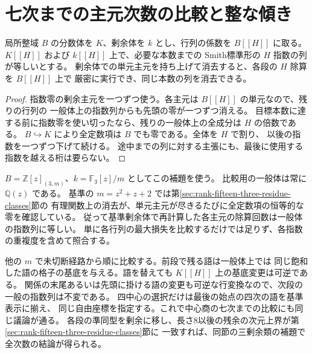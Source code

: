 \section{七次までの主元次数の比較と整な傾き}
\label{sec:rank-fifteen-smith-slopes}
\begin{lemma}\label{lem:rank-fifteen-smith-transfer}
局所整域 $B$ の分数体を $K$、剰余体を $k$ とし、行列の係数を
$B[[H]]$ に取る。$K[[H]]$ および $k[[H]]$ 上で、必要な本数までの
Smith標準形の $H$ 指数の列が等しいとする。
剰余体での単元主元を持ち上げて消去すると、各段の $H$ 除算を $B[[H]]$ 上で
厳密に実行でき、同じ本数の列を消去できる。
\end{lemma}
\begin{proof}
指数零の剰余主元を一つずつ使う。各主元は $B[[H]]$ の単元なので、残りの行列の
一般体上の指数列からも先頭の零が一つずつ消える。
目標本数に達する前に指数零を使い切ったなら、残りの一般体上の全成分は $H$ の倍数である。
$B\hookrightarrow K$ により全定数項は $B$ でも零である。全体を $H$ で割り、
以後の指数を一つずつ下げて続ける。
途中までの列に対する主張にも、最後に使用する指数を越える桁は要らない。
\end{proof}
$B=\mathbb Z[z]_{(3,m)}$、$k=\mathbb F_3[z]/m$ としてこの補題を使う。
比較用の一般体は常に $\mathbb Q(z)$ である。
基準の $m=z^2+z+2$ では第\ref{sec:rank-fifteen-three-residue-classes}節の
有理関数上の消去が、単元主元が尽きるたびに全定数項の恒等的な零を確認している。
従って基準剰余体で再計算した各主元の除算回数は一般体の指数列に等しい。
単に各行列の最大損失を比較するだけでは足りず、各指数の重複度を含めて照合する。

他の $m$ で未切断経路から順に比較する。前段で残る語は一般体上では
同じ飽和した語の格子の基底を与える。語を替えても $K[[H]]$ 上の基底変更は可逆である。
関係の末尾あるいは先頭に掛ける語の変更も可逆な行変換なので、次段の一般の指数列は不変である。
四中心の選択だけは最後の始点の四次の語を基準表示に揃え、
同じ自由座標を指定する。これで中心商の七次までの比較にも同じ議論が通る。
各段の準同型を剰余に移し、長さ8以後の残余の次元上界が第\ref{sec:rank-fifteen-three-residue-classes}節に
一致すれば、同節の三剰余類の補題で全次数の結論が得られる。

